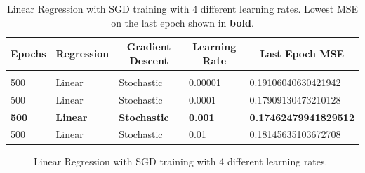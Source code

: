 \documentclass{article} %
\begin{document}
\begin{table}[!htbp]
\caption{Linear Regression with SGD training with 4 different learning rates. Lowest MSE on the last epoch shown in \textbf{bold}.}
\label{Table1}
\begin{center}
\begin{tabular}{l l l l l}
\multicolumn{1}{c}{\bf Epochs} &\multicolumn{1}{c}{\bf Regression}  &\multicolumn{1}{c}{\bf Gradient Descent} &\multicolumn{1}{c}{\bf Learning Rate} &\multicolumn{1}{c}{\bf Last Epoch MSE}
\\ \hline \\

500 & Linear & Stochastic & 0.00001 & 0.19106040630421942\\
500 & Linear & Stochastic & 0.0001  & 0.17909130473210128\\

\textbf{500} & \textbf{Linear} & \textbf{Stochastic} & \textbf{0.001} & \textbf{0.17462479941829512}\\

500 & Linear & Stochastic & 0.01    & 0.18145635103672708\\

\end{tabular}
\end{center}
\end{table}

\clearpage

\begin{figure}[!htbp]
\begin{center}
\end{center}
\caption{Linear Regression with SGD training with 4 different learning rates.}
\label{Fig1}
\end{figure}
\end{document}
